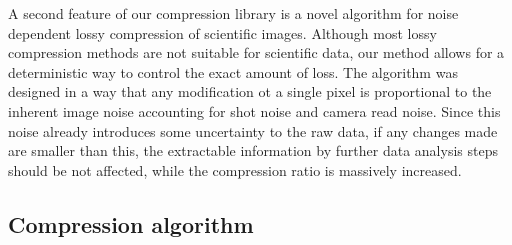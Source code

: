   A second feature of our compression library is a novel algorithm for noise dependent lossy compression of scientific images. Although most lossy compression methods are not suitable for scientific data, our method allows for a deterministic way to control the exact amount of loss. The algorithm was designed in a way that any modification ot a single pixel is proportional to the inherent image noise accounting for shot noise and camera read noise. Since this noise already introduces some uncertainty to the raw data, if any changes made are smaller than this, the extractable information by further data analysis steps should be not affected, while the compression ratio is massively increased. 
  









    


    

  \subsection{Compression algorithm}

